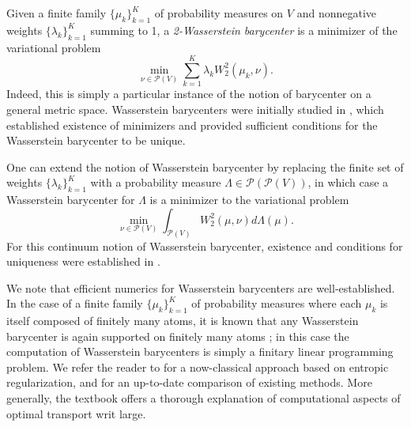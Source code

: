 \documentclass[aos, preprint]{imsart}
\theoremstyle{plain}
\theoremstyle{remark}
\begin{document}
{Given a finite family $\{\mu_k\}_{k=1}^K$ of probability measures on $V$ and nonnegative weights $\{\lambda_k\}_{k=1}^K$ summing to 1, a \emph{2-Wasserstein barycenter} is a minimizer of the variational problem
$$\min_{\nu\in\mathcal{P}(V)}\sum_{k=1}^K \lambda_k W_2^2(\mu_k,\nu).$$
Indeed, this is simply a particular instance of the notion of barycenter on a general metric space. Wasserstein barycenters were initially studied in \cite{agueh2011barycenters}, which established existence of minimizers and provided sufficient conditions for the Wasserstein barycenter to be unique.

One can extend the notion of Wasserstein barycenter by replacing the finite set of weights $\{\lambda_k\}_{k=1}^K$ with a probability measure $\Lambda \in \mathcal{P}(\mathcal{P}(V))$, in which case a Wasserstein barycenter for $\Lambda$ is a minimizer to the variational problem
$$\min_{\nu\in\mathcal{P}(V)}\int_{\mathcal{P}(V)}  W_2^2(\mu,\nu)d\Lambda (\mu).$$
For this continuum notion of Wasserstein barycenter, existence and conditions for uniqueness were  established in \cite{kim2017wasserstein}.

We note that efficient numerics for Wasserstein barycenters are well-established. In the case of a finite family $\{\mu_k\}_{k=1}^K$ of probability measures where each $\mu_k$ is itself composed of finitely many atoms, it is known that any Wasserstein barycenter is again supported  on finitely many atoms \cite{anderes2016discrete}; in this case the computation of Wasserstein barycenters is simply a finitary linear programming problem. We refer the reader to \cite{cuturi2014fast} for a now-classical approach based on entropic regularization, and \cite{chizat2023doubly} for an up-to-date comparison of existing methods. More generally, the textbook \cite{peyre2019computational} offers a thorough explanation of computational aspects of optimal transport writ large.

}
\end{document}
